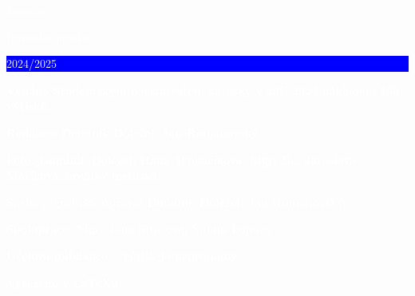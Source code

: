 \documentclass[a5paper, twoside]{article}
\begin{document}
\pagestyle{empty}
\pagecolor{red}
\noindent\hspace{-3pt}\textcolor{white}{\fontsize{20}{20} \Kapitan Jaroška}

\vspace*{\fill}


\noindent\hspace{-3pt}\textcolor{white}{\fontsize{25}{25} \Kapitan Průvodce prváka. \colorbox{blue}{\rule[5pt]{0pt}{15pt}\large 2024/2025}}

\vspace{1em}

\noindent\textcolor{white}{\textbf{Vydáno Studentským parlamentem Jarošky v září 2024 nákladem 130 výtisků.}}

\vspace{1em}

\noindent \textcolor{white}{\textbf{Redakce: Dominik Doležel, Jan Romanovský}}

\vspace{1em}

\noindent \textcolor{white}{\textbf{Foto: Dominik Doležel, Hana Trubačíková, Mgr. Bc. Jaroslava Maříková, archivy institucí}}

\vspace{1em}

\noindent \textcolor{white}{\textbf{Sazba a grafická úprava: Dominik Doležel, Jan Romanovský}}

\vspace{1em}

\noindent \textcolor{white}{\textbf{Spolupráce: Mgr. Jana Sítařová, Šimon Lopour}}

\vspace{1em}

\noindent \textcolor{white}{\textbf{Účelová publikace -- výtisk je neprodejný.}}

\vspace{1em}

\noindent \textcolor{white}{\textbf{Vysázeno v \LaTeX u.}}
\end{document}
